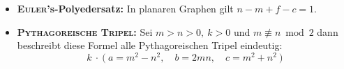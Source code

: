 \begin{itemize}

	
	
	\item \textbf{\textsc{Euler}'s-Polyedersatz:}
	In planaren Graphen gilt $n-m+f-c=1$.
	
	\item \textbf{\textsc{Pythagoreische Tripel}:}
	Sei $m>n>0,~k>0$ und $m\not\equiv n \bmod 2$ dann beschreibt diese Formel alle Pythagoreischen Tripel eindeutig:
	\[k~\cdot~\Big(~a=m^2-n^2,\quad b=2mn,\quad c=m^2+n^2~\Big)\]
	

\end{itemize}
